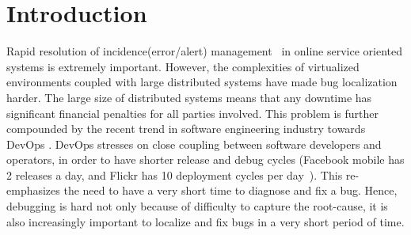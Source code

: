 \section{Introduction}
\label{sec:intro}

Rapid resolution of incidence(error/alert) management~\cite{sasase2013} in online service oriented systems is extremely important.
However, the complexities of virtualized environments coupled with large distributed systems have made bug localization harder. 
The large size of distributed systems means that any downtime has significant financial penalties for all parties involved.
This problem is further compounded by the recent trend in software engineering industry towards DevOps \cite{devops}. 
DevOps stresses on close coupling between software developers and operators, in order to have shorter release and debug cycles (Facebook mobile has 2 releases a day, and Flickr has 10 deployment cycles per day~\cite{10DevOps}). 
This re-emphasizes the need to have a very short time to diagnose and fix a bug.
Hence, debugging is hard not only because of difficulty to capture the root-cause, it is also increasingly important to localize and fix bugs in a very short period of time.



